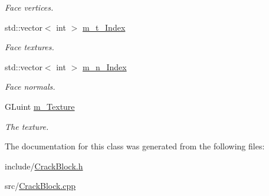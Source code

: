 \begin{DoxyCompactItemize}
\begin{DoxyCompactList}\small\item\em Face vertices. \end{DoxyCompactList}\item 
\hypertarget{classCrackBlock_a5566f0b2d5b02780e94b6fdd70e8527c}{std\-::vector$<$ int $>$ \hyperlink{classCrackBlock_a5566f0b2d5b02780e94b6fdd70e8527c}{m\-\_\-t\-\_\-\-Index}}\label{classCrackBlock_a5566f0b2d5b02780e94b6fdd70e8527c}

\begin{DoxyCompactList}\small\item\em Face textures. \end{DoxyCompactList}\item 
\hypertarget{classCrackBlock_a1e84c442102935294e7091e61927cddd}{std\-::vector$<$ int $>$ \hyperlink{classCrackBlock_a1e84c442102935294e7091e61927cddd}{m\-\_\-n\-\_\-\-Index}}\label{classCrackBlock_a1e84c442102935294e7091e61927cddd}

\begin{DoxyCompactList}\small\item\em Face normals. \end{DoxyCompactList}\item 
\hypertarget{classCrackBlock_af662e4e87166cbf379aea9d8b6e651b6}{G\-Luint \hyperlink{classCrackBlock_af662e4e87166cbf379aea9d8b6e651b6}{m\-\_\-\-Texture}}\label{classCrackBlock_af662e4e87166cbf379aea9d8b6e651b6}

\begin{DoxyCompactList}\small\item\em The texture. \end{DoxyCompactList}\end{DoxyCompactItemize}


The documentation for this class was generated from the following files\-:\begin{DoxyCompactItemize}
\item 
include/\hyperlink{CrackBlock_8h}{Crack\-Block.\-h}\item 
src/\hyperlink{CrackBlock_8cpp}{Crack\-Block.\-cpp}\end{DoxyCompactItemize}

